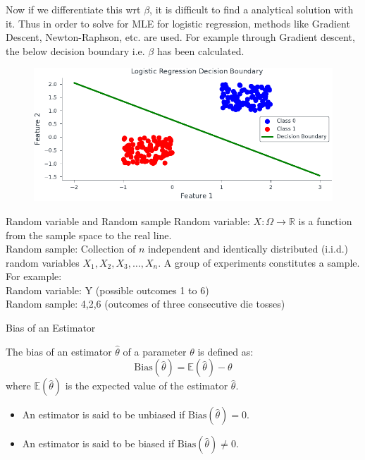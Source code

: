 \documentclass[handout]{beamer}
\begin{document}
\begin{frame}
    Now if we differentiate this wrt $\beta$, it is difficult to find a analytical solution with it.
    Thus in order to solve for MLE for logistic regression, methods like Gradient Descent, Newton-Raphson, etc. are used. For example through Gradient descent, the below decision boundary i.e. $\beta$ has been calculated.
    \begin{figure}
                \includegraphics[scale=0.8]{../figures/mle/log_reg.pdf}
            \end{figure}
\end{frame}

    \begin{frame}{Random variable and Random sample}
    Random variable: $X:\Omega\rightarrow\mathbb{R}$ is a function from the sample space to the real line. \\ 
    \addlinespace
    \addlinespace
    Random sample: Collection of $n$ independent and identically distributed (i.i.d.) random variables $X_1, X_2, X_3, \ldots, X_n$. A group of experiments constitutes a sample.\\
    \addlinespace
    \addlinespace
    For example:\\
    Random variable: Y (possible outcomes 1 to 6)\\
    Random sample: {4,2,6} (outcomes of three consecutive die tosses)
    \end{frame}

    \begin{frame}{Bias of an Estimator}
        \begin{tcolorbox}[colback=metropolisblue!5,colframe=metropolisblue,title=Bias of an Estimator]
            The bias of an estimator $\hat{\theta}$ of a parameter $\theta$ is defined as:
            \[
                \text{Bias}(\hat{\theta}) = \mathbb{E}(\hat{\theta}) - \theta
            \]
            where $\mathbb{E}(\hat{\theta})$ is the expected value of the estimator $\hat{\theta}$.
        \end{tcolorbox}
        \begin{itemize}
            \item An estimator is said to be unbiased if $\text{Bias}(\hat{\theta}) = 0$.
            \item An estimator is said to be biased if $\text{Bias}(\hat{\theta}) \neq 0$.
        \end{itemize}
        
    \end{frame}
    
\end{document}
